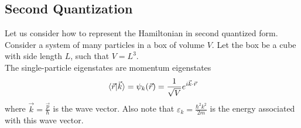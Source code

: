 \documentclass[12pt,a4paper,titlepage]{article}
\begin{document}
\subsection{Second Quantization}
Let us consider how to represent the Hamiltonian in second quantized form. Consider a system of many particles in a box of volume $V$. Let the box be a cube with side length $L$, such that $V=L^{3}$.\\

The single-particle eigenstates are momentum eigenstates
\begin{equation}
\ip*{\vec{r}}{\vec{k}}=\psi_{k}(\vec{r})=\frac{1}{\sqrt{V}}e^{i\vec{k}\cdot\vec{r}}
\end{equation}
where $\vec{k}=\frac{\vec{p}}{\hbar}$ is the wave vector. Also note that $\varepsilon_{k}=\frac{\hbar^{2}k^{2}}{2m}$ is the energy associated with this wave vector.
\end{document}
